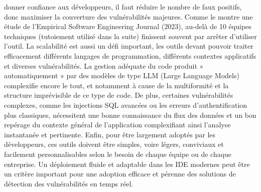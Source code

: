donner confiance aux développeurs, il faut réduire le nombre de faux positifs, donc
maximiser la couverture des vulnérabilités majeures. Comme le montre une étude de
l’Empirical Software Engineering Journal (2023), au-delà de 10 %
équipes techniques (tutoiement utilisé dans la suite) finissent souvent par arrêter d’utiliser
l’outil. La scalabilité est aussi un défi important, les outils devant pouvoir traiter efficacement
différents langages de programmation, différents contextes applicatifs et diverses
vulnérabilités. La gestion adéquate du code produit « automatiquement » par des modèles
de type LLM (Large Language Models) complexifie encore le tout, et notamment à cause de
la multiformité et la structure imprévisible de ce type de code.
De plus, certaines vulnérabilités complexes, comme les injections SQL avancées ou les
erreurs d’authentification plus classiques, nécessitent une bonne connaissance du flux des
données et un bon repérage du contexte général de l’application complexifiant ainsi
l’analyse instantanée et pertinente.
Enfin, pour être largement adoptés par les développeurs, ces outils doivent être simples,
voire légers, conviviaux et facilement personnalisables selon le besoin de chaque équipe ou
de chaque entreprise. Un déploiement fluide et adaptable dans les IDE modernes peut être
un critère important pour une adoption efficace et pérenne des solutions de détection des
vulnérabilités en temps réel.
